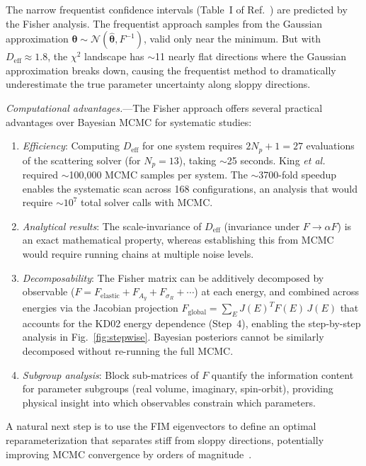 \documentclass[aps,prl,reprint,superscriptaddress,showpacs]{revtex4-2}
\begin{document}
The narrow frequentist confidence intervals (Table~I of Ref.~\cite{King2019PRL}) are predicted by the Fisher analysis. The frequentist approach samples from the Gaussian approximation $\boldsymbol{\theta} \sim \mathcal{N}(\hat{\boldsymbol{\theta}}, F^{-1})$, valid only near the minimum. But with $D_\mathrm{eff} \approx 1.8$, the $\chi^2$ landscape has $\sim$11 nearly flat directions where the Gaussian approximation breaks down, causing the frequentist method to dramatically underestimate the true parameter uncertainty along sloppy directions.

\textit{Computational advantages.}---The Fisher approach offers several practical advantages over Bayesian MCMC for systematic studies:
\begin{enumerate}
\item \emph{Efficiency}: Computing $D_\mathrm{eff}$ for one system requires $2N_p + 1 = 27$ evaluations of the scattering solver (for $N_p = 13$), taking $\sim$25 seconds. King \textit{et al.} required $\sim$100,000 MCMC samples per system. The $\sim$3700-fold speedup enables the systematic scan across 168 configurations, an analysis that would require $\sim$$10^7$ total solver calls with MCMC.
\item \emph{Analytical results}: The scale-invariance of $D_\mathrm{eff}$ (invariance under $F \to \alpha F$) is an exact mathematical property, whereas establishing this from MCMC would require running chains at multiple noise levels.
\item \emph{Decomposability}: The Fisher matrix can be additively decomposed by observable ($F = F_\mathrm{elastic} + F_{A_y} + F_{\sigma_R} + \cdots$) at each energy, and combined across energies via the Jacobian projection $F_\mathrm{global} = \sum_E J(E)^T F(E)\, J(E)$ that accounts for the KD02 energy dependence (Step~4), enabling the step-by-step analysis in Fig.~\ref{fig:stepwise}. Bayesian posteriors cannot be similarly decomposed without re-running the full MCMC.
\item \emph{Subgroup analysis}: Block sub-matrices of $F$ quantify the information content for parameter subgroups (real volume, imaginary, spin-orbit), providing physical insight into which observables constrain which parameters.
\end{enumerate}

A natural next step is to use the FIM eigenvectors to define an optimal reparameterization that separates stiff from sloppy directions, potentially improving MCMC convergence by orders of magnitude~\cite{Catacora2021}.
\end{document}

